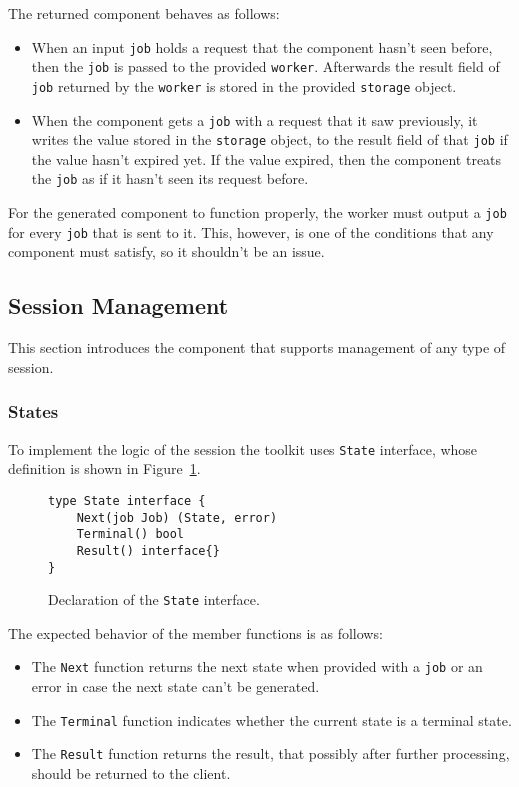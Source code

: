 \newpage
The returned component behaves as follows:
\begin{itemize}
  \item When an input \texttt{job} holds a request that the component 
        hasn't seen before, then the \texttt{job} is passed to the 
        provided \texttt{worker}. Afterwards the result field of \texttt{job}
        returned by the \texttt{worker} is stored in the provided 
        \texttt{storage} object.

  \item When the component gets a \texttt{job} with a request that it saw 
        previously, it writes the value stored in the \texttt{storage} object,
        to the result field of that \texttt{job} if the value hasn't expired yet. 
        If the value expired, then the component treats the \texttt{job} as if it
        hasn't seen its request before.
\end{itemize}

For the generated component to function properly, the worker must output
a \texttt{job} for every \texttt{job} that is sent to it. This, however, 
is one of the conditions that any component must satisfy, so it shouldn't 
be an issue.

\subsection{Session Management}
This section introduces the component that supports management of any
type of session.
\subsubsection{States}
\label{sec:state}
To implement the logic of the session the toolkit uses \texttt{State}
interface, whose definition is shown in Figure~\ref{fig:State}.
\begin{figure}[h]
\centering
\begin{lstlisting}
type State interface {
    Next(job Job) (State, error)
    Terminal() bool
    Result() interface{}
}
\end{lstlisting}
\caption[scale=1.0]{Declaration of the \texttt{State} interface.}
\label{fig:State}
\end{figure}
The expected behavior of the member functions is as follows:
\begin{itemize}
	\item The \texttt{Next} function returns the next state when provided 
          with a \texttt{job} or an error in case the next state can't be 
          generated.
	\item The \texttt{Terminal} function indicates whether the current 
          state is a terminal state.
	\item The \texttt{Result} function returns the result, that possibly 
          after further processing, should be returned to the client.
\end{itemize}

